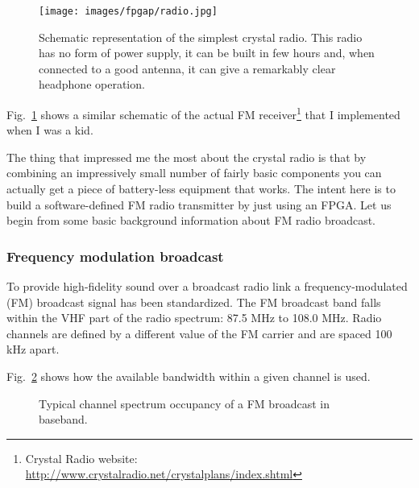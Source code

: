 \documentclass[13pt]{extreport}
\begin{document}
\begin{figure}[!b]
    \centering
	\texttt{[image: images/fpgap/radio.jpg]}
	\caption{Schematic representation of the simplest crystal radio. This radio has no form of power supply, it can be built in few hours and, when connected to a good antenna, it can give a remarkably clear headphone operation.}
	\label{radio}
\end{figure}

Fig.~\ref{radio} shows a similar schematic of the actual FM receiver\footnote{Crystal Radio website: \scriptsize\url{http://www.crystalradio.net/crystalplans/index.shtml}} that I implemented when I was a kid.

The thing that impressed me the most about the crystal radio is that by combining an impressively small number of fairly basic components you can actually get a piece of battery-less equipment that works. The intent here is to build a software-defined FM radio transmitter by just using an FPGA. Let us begin from some basic background information about FM radio broadcast.

\subsubsection{Frequency modulation broadcast}

To provide high-fidelity sound over a broadcast radio link a frequency-modulated (FM) broadcast signal has been standardized. The FM broadcast band falls within the VHF part of the radio spectrum: 87.5 MHz to 108.0 MHz. Radio channels are defined by a different value of the FM carrier and are spaced 100 kHz apart.

Fig.~\ref{fm_band} shows how the available bandwidth within a given channel is used.

\begin{figure}
    \centering
{}
\caption{Typical channel spectrum occupancy of a FM broadcast in baseband.}
\label{fm_band}
\end{figure}
\end{document}
